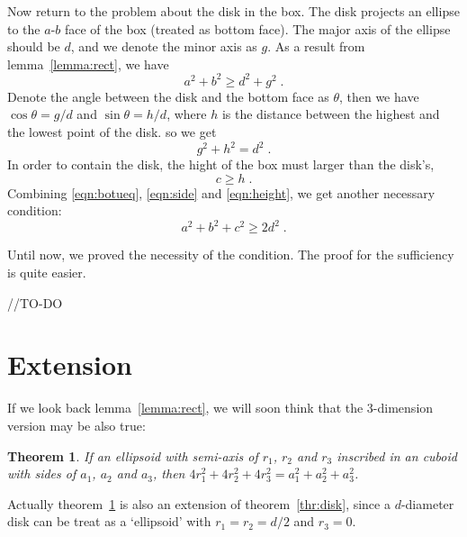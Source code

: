 \documentclass[10pt,a4paper]{article}
\newtheorem{theorem}{Theorem}
\begin{document}
	Now return to the problem about the disk in the box. The disk projects an ellipse to the $a$-$b$ face of the box (treated as bottom face). The major axis of the ellipse should be $d$, and we denote the minor axis as $g$. As a result from lemma~\ref{lemma:rect}, we have
	\begin{equation}
	\label{eqn:botueq}
	a^2+b^2\geq d^2+g^2\;.
	\end{equation}
	Denote the angle between the disk and the bottom face as $\theta$, then we have $\cos \theta =g/d$ and $\sin \theta = h/d $, where $h$ is the distance between the highest and the lowest point of the disk. so we get
	\begin{equation}
	\label{eqn:side}
	g^2+h^2=d^2\;.
	\end{equation}
	In order to contain the disk, the hight of the box must larger than the disk's,
	\begin{equation}
	\label{eqn:height}
	c\geq h\;.
	\end{equation}
	Combining \eqref{eqn:botueq}, \eqref{eqn:side} and \eqref{eqn:height}, we get another necessary condition:
	\[
	a^2+b^2+c^2\geq 2d^2\;.
	\]
	
	Until now, we proved the necessity of the condition. The proof for the sufficiency is quite easier.
	
	//TO-DO
	\section{Extension}
	
	If we look back lemma~\ref{lemma:rect}, we will soon think that the 3-dimension version may be also true:
	\begin{theorem}
		\label{thr:3d}
		If an ellipsoid with semi-axis of $r_1$, $r_2$ and $r_3$ inscribed in an cuboid with sides of $a_1$, $a_2$ and $a_3$, then $4r_1^2+4r_2^2+4r_3^2=a_1^2+a_2^2+a_3^2$.
	\end{theorem}
	Actually theorem~\ref{thr:3d} is also an extension of theorem~\ref{thr:disk}, since a $d$-diameter disk can be treat as a `ellipsoid' with $r_1=r_2=d/2$ and $r_3=0$.
\end{document}
